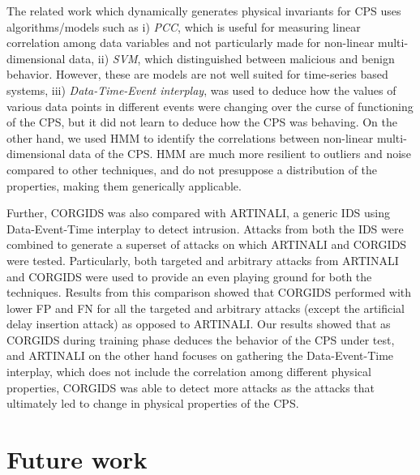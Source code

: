 The related work which dynamically generates physical invariants for \ac{CPS} uses algorithms/models such as i) \textit{\acf{PCC}}, which is useful for measuring linear correlation among data variables and not particularly made for non-linear multi-dimensional data, ii) \textit{\acf{SVM}}, which distinguished between malicious and benign behavior. However, these are models are not well suited for time-series based systems, iii) \textit{Data-Time-Event interplay}, was used to deduce how the values of various data points in different events were changing over the curse of functioning of the \ac{CPS}, but it did not learn to deduce how the \ac{CPS} was behaving. On the other hand, we used \acf{HMM} to identify the correlations between non-linear multi-dimensional data of the \ac{CPS}. \ac{HMM} are much more resilient to outliers and noise compared to other techniques, and do not presuppose a distribution of the properties, making them generically applicable.

Further, \ac{CORGIDS} was also compared with ARTINALI, a generic \ac{IDS} using Data-Event-Time interplay to detect intrusion. Attacks from both the \ac{IDS} were combined to generate a superset of attacks on which ARTINALI and \ac{CORGIDS} were tested. Particularly, both targeted and arbitrary attacks from ARTINALI and \ac{CORGIDS} were used to provide an even playing ground for both the techniques. Results from this comparison showed that \ac{CORGIDS} performed with lower \ac{FP} and \ac{FN} for all the targeted and arbitrary attacks (except the artificial delay insertion attack) as opposed to ARTINALI. Our results showed 
that as \ac{CORGIDS} during training phase deduces the behavior of the \ac{CPS} under test, and ARTINALI on the other hand focuses on gathering the Data-Event-Time interplay, which does not include the correlation among different physical properties, \ac{CORGIDS} was able to detect more attacks as the attacks that ultimately led to change in physical properties of the \ac{CPS}.


\section{Future work}

